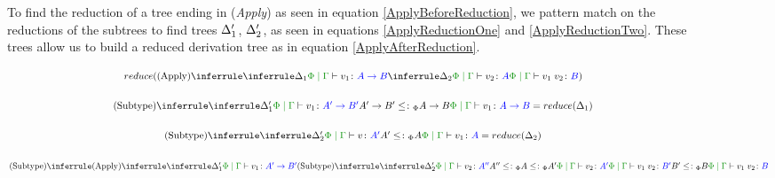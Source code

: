 \documentclass{Report}
\begin{document}
\begin{figure}
    \begin{framed}
    To find the reduction of a tree ending in (\textit{Apply}) as seen in equation \ref{ApplyBeforeReduction}, we pattern match on the reductions of the subtrees to find trees $\Delta_1'$, $\Delta_2'$, as seen in equations \ref{ApplyReductionOne} and \ref{ApplyReductionTwo}. These trees allow us to build a reduced derivation tree as in equation \ref{ApplyAfterReduction}.

    \begin{equation}\label{ApplyBeforeReduction}
        \scalebox{.8}{$
        \reduce(\ntreeruleII{Apply}{
            \treeruleI{\D_1}{
                \gpetyperelation{v_1}{\ab}
            }
        }{
            \treeruleI{\D_2}{
                \gpetyperelation{v_2}{A}
            }
        }{
            \gpetyperelation{\apply{v_1}{v_2}}{B}
        })
        $}
    \end{equation}

    \begin{equation}\label{ApplyReductionOne}
        \scalebox{.8}{$
            \ntreeruleII{Subtype}{
                \treeruleI{\D'_1}{\gpetyperelation{v_1}{\fntype{A'}{B'}}}
            }{
                \fntype{A'}{B'}\subtypep\fntype{A}{B}
            }{
                \gpetyperelation{v_1}{\ab}
            }  = \reduce(\D_1)
            $}
    \end{equation}

    \begin{equation}\label{ApplyReductionTwo}
        \scalebox{.8}{$
        \ntreeruleII{Subtype}{
            \treeruleI{\D'_2}{\gpetyperelation{v}{A'}}
        }{
            A'\subtypep A
        }{
            \gpetyperelation{v_1}{A}
        } = \reduce(\D_2)
        $}
    \end{equation}


    \begin{equation}\label{ApplyAfterReduction}
        \scalebox{.8}{$
        \ntreeruleII{Subtype}{
            \ntreeruleII{Apply}{
                \treeruleI{
                    \D'_1
                }{
                    \gpetyperelation{v_1}{\fntype{A'}{B'}}
                }
            }{
                \ntreeruleII{Subtype}{
                    \treeruleI{\D'_2}{\gpetyperelation{v_2}{A''}}
                }{
                    A'' \subtypep A \subtypep A'
                } {
                    \gpetyperelation{v_2}{A'}
                }
            }{
                \gpetyperelation{\apply{v_1}{v_2}}{B'}
            }
        }{
            B' \subtypep B
        }{
            \gpetyperelation{\apply{v_1}{v_2}}{B}
        }
        $}
    \end{equation}



\end{framed}
\end{figure}
\end{document}
